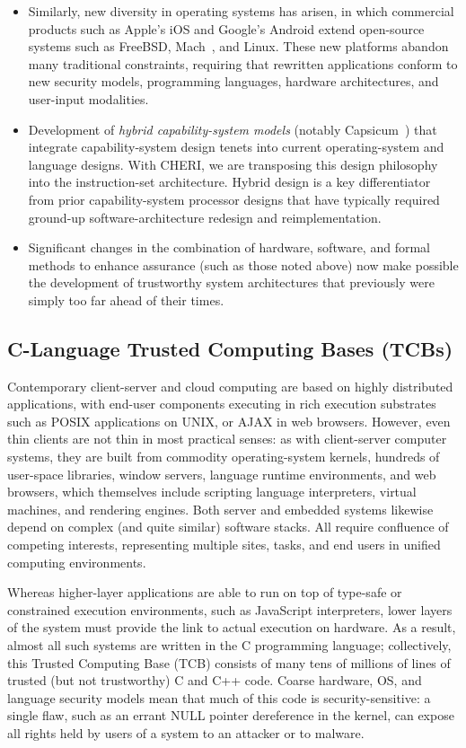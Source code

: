 \begin{itemize}
\item Similarly, 
new diversity in operating systems has arisen, in which commercial
products such as Apple's iOS and Google's Android extend open-source systems
such as FreeBSD, Mach~\cite{accetta:mach}, and Linux.
These new platforms abandon many traditional constraints, requiring 
that rewritten
applications conform to new security models, programming languages,
hardware architectures, and user-input modalities.

\item Development of {\em hybrid capability-system models} (notably Capsicum~\cite{Watson10}) that integrate capability-system design tenets into current operating-system and language designs.
With CHERI, we are transposing this design philosophy into the instruction-set architecture.
Hybrid design is a key differentiator from prior capability-system processor designs that have typically required ground-up software-architecture redesign and reimplementation.

\item Significant changes in the combination of hardware, software,
and formal methods to enhance assurance (such as those noted above)
now make possible the development of trustworthy system
architectures that previously were simply too far ahead of their times.
\end{itemize}

\subsection{C-Language Trusted Computing Bases (TCBs)}

Contemporary client-server and cloud computing are based on highly distributed
applications, with end-user components executing in rich execution substrates such
as POSIX applications on UNIX, or AJAX in web browsers.
However, even thin clients are not thin in most practical senses: as with client-server
computer systems, they are built from commodity operating-system kernels, hundreds
of user-space libraries, window servers, language runtime environments, and web
browsers, which themselves include scripting language interpreters, virtual machines,
and rendering engines.
Both server and embedded systems likewise depend on complex (and quite
similar) software stacks.
All require confluence of competing interests, representing multiple sites, tasks, and end users in unified computing environments.

Whereas higher-layer applications are able to run on top of type-safe or constrained
execution environments, such as JavaScript interpreters, lower layers of the system
must provide the link to actual execution on hardware.
As a result, almost all such systems are written in the C programming language;
collectively, this Trusted Computing Base (TCB) consists of many tens of millions of
lines of trusted (but not trustworthy) C and C++ code.
Coarse hardware, OS, and language security models mean that much of this code is
security-sensitive: a single flaw, such as an errant NULL pointer dereference in the kernel,
can expose all rights held by users of a system to an attacker or to malware.

